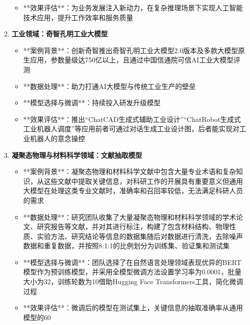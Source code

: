 \begin{frame}[allowframebreaks]
\begin{enumerate}
\begin{itemize}
                \item **效果评估**：为业务发展注入新动力，在复杂推理场景下实现人工智能技术应用，提升工作效率和服务质量
            \end{itemize}
        \item
            \textbf{工业领域：奇智孔明工业大模型}
            \begin{itemize}
                \item **案例背景**：创新奇智推出奇智孔明工业大模型2.0版本及多款大模型原生应用，参数量级达750亿以上，且通过中国信通院可信AI工业大模型评测
                \item **数据处理**：助力打通AI大模型与传统工业生产的壁垒
                \item **模型选择与微调**：持续投入研发升级模型
                \item **效果评估**：推出“ChatCAD生成式辅助工业设计”“ChatRobot生成式工业机器人调度”等应用前者可通过对话生成工业设计图，后者能实现对工业机器人的意念操控 
            \end{itemize}
        \item
            \textbf{凝聚态物理与材料科学领域：文献抽取模型}
            \begin{itemize}
                \item **案例背景**：凝聚态物理和材料科学文献中包含大量专业术语和复杂知识，从这些文献中提取关键信息，对科研工作的开展具有重要意义但通用大模型在处理这类专业文献时，准确率和召回率较低，无法满足科研人员的需求
                \item **数据处理**：研究团队收集了大量凝聚态物理和材料科学领域的学术论文、研究报告等文献，并对其进行标注，构建了包含材料结构、物理性质、实验方法、研究结论等信息的数据集随后对数据进行清洗，去除噪声数据和重复数据，并按照8:1:1的比例划分为训练集、验证集和测试集
                \item **模型选择与微调**：团队选择了在自然语言处理领域表现优异的BERT模型作为预训练模型，并采用全模型微调方法设置学习率为0.0001，批量大小为32，训练轮数为10借助Hugging Face Transformers工具，简化微调过程
                \item **效果评估**：微调后的模型在测试集上，关键信息的抽取准确率从通用模型的60%
            \end{itemize}
    \end{enumerate}
\end{frame}

